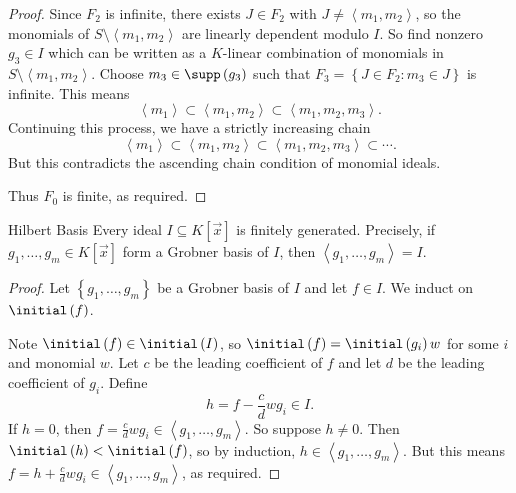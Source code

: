 \documentclass[co439]{subfiles}
\begin{document}
\begin{proof}
        Since $F_2$ is infinite, there exists $J\in F_2$ with $J\neq\left< m_1,m_2 \right>$, so the monomials of $S\setminus \left< m_1,m_2 \right>$ are linearly dependent modulo $I$. So find nonzero $g_3\in I$ which can be written as a $K$-linear combination of monomials in $S\setminus\left< m_1,m_2 \right>$. Choose $m_3\in\supp\left( g_3 \right)$ such that $F_3 = \left\lbrace J\in F_2:m_3\in J \right\rbrace$ is infinite. This means
        \begin{equation*}
            \left< m_1 \right>\subset\left< m_1,m_2 \right>\subset\left< m_1,m_2,m_3 \right>.   
        \end{equation*}
        Continuing this process, we have a strictly increasing chain
        \begin{equation*}
            \left< m_1 \right>\subset\left< m_1,m_2 \right>\subset\left< m_1,m_2,m_3 \right>\subset\cdots.   
        \end{equation*}
        But this contradicts the ascending chain condition of monomial ideals.

        Thus $F_0$ is finite, as required.
    \end{proof}
    
    \begin{theorem}{Hilbert Basis}
        Every ideal $I\subseteq K\left[ \vec{x} \right]$ is finitely generated. Precisely, if $g_1,\ldots,g_m\in K\left[ \vec{x} \right]$ form a Grobner basis of $I$, then $\left< g_1,\ldots,g_m \right> = I$. 
    \end{theorem}
    
    \begin{proof}
        Let $\left\lbrace g_1,\ldots,g_m \right\rbrace$ be a Grobner basis of $I$ and let $f\in I$. We induct on $\initial\left( f \right)$.

        Note $\initial\left( f \right)\in\initial\left( I \right)$, so $\initial\left( f \right) = \initial\left( g_i \right)w$ for some $i$ and monomial $w$. Let $c$ be the leading coefficient of $f$ and let $d$ be the leading coefficient of $g_i$. Define
        \begin{equation*}
            h = f-\frac{c}{d} wg_i\in I.
        \end{equation*}
        If $h=0$, then $f=\frac{c}{d}wg_i\in\left< g_1,\ldots,g_m \right>$. So suppose $h\neq 0$. Then $\initial\left( h \right)<\initial\left( f \right)$, so by induction, $h\in\left< g_1,\ldots,g_m \right>$. But this means $f=h+\frac{c}{d}wg_i\in\left< g_1,\ldots,g_m \right>$, as required.  
    \end{proof}
\end{document}
